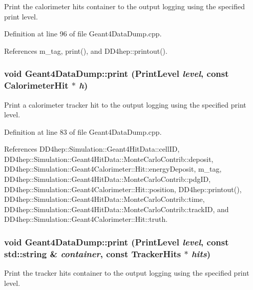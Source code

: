 Print the calorimeter hits container to the output logging using the specified print level. 

Definition at line 96 of file Geant4DataDump.cpp.

References m\_\-tag, print(), and DD4hep::printout().\hypertarget{class_d_d4hep_1_1_simulation_1_1_geant4_data_dump_a213bbcf2c9fb78f71afefe34935f3017}{
\subsubsection[{print}]{\setlength{\rightskip}{0pt plus 5cm}void Geant4DataDump::print ({\bf PrintLevel} {\em level}, \/  const {\bf CalorimeterHit} $\ast$ {\em h})}}
\label{class_d_d4hep_1_1_simulation_1_1_geant4_data_dump_a213bbcf2c9fb78f71afefe34935f3017}


Print a calorimeter tracker hit to the output logging using the specified print level. 

Definition at line 83 of file Geant4DataDump.cpp.

References DD4hep::Simulation::Geant4HitData::cellID, DD4hep::Simulation::Geant4HitData::MonteCarloContrib::deposit, DD4hep::Simulation::Geant4Calorimeter::Hit::energyDeposit, m\_\-tag, DD4hep::Simulation::Geant4HitData::MonteCarloContrib::pdgID, DD4hep::Simulation::Geant4Calorimeter::Hit::position, DD4hep::printout(), DD4hep::Simulation::Geant4HitData::MonteCarloContrib::time, DD4hep::Simulation::Geant4HitData::MonteCarloContrib::trackID, and DD4hep::Simulation::Geant4Calorimeter::Hit::truth.\hypertarget{class_d_d4hep_1_1_simulation_1_1_geant4_data_dump_a2427e186357f34940bb19be59406e7c9}{
\subsubsection[{print}]{\setlength{\rightskip}{0pt plus 5cm}void Geant4DataDump::print ({\bf PrintLevel} {\em level}, \/  const std::string \& {\em container}, \/  const {\bf TrackerHits} $\ast$ {\em hits})}}
\label{class_d_d4hep_1_1_simulation_1_1_geant4_data_dump_a2427e186357f34940bb19be59406e7c9}


Print the tracker hits container to the output logging using the specified print level. 

